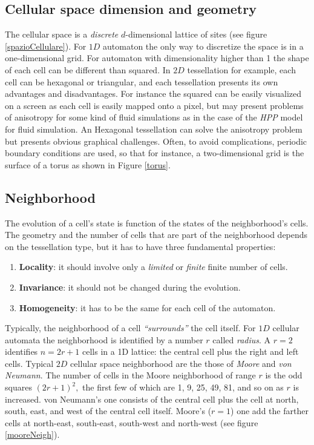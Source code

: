 \subsection{Cellular space dimension and geometry}
The cellular space is a \emph{discrete} $d$-dimensional lattice of sites (see
figure \ref{spazioCellulare}).
For $1D$ automaton the only way to discretize the space is in a one-dimensional
grid. For automaton with dimensionality higher than 1 the shape of each cell can
be different than squared. In $2D$ tessellation for example, each cell can be
hexagonal or triangular, and each tessellation presents its own advantages and disadvantages. For instance the squared can be easily visualized on a screen as each cell is easily mapped onto a pixel, but may present problems of anisotropy for some kind of fluid simulations as in the case of the \textit{HPP} model for fluid simulation\cite{Frisch1986}. An Hexagonal tessellation can solve the anisotropy problem\cite{wolfram1986} but presents obvious graphical challenges. Often, to avoid complications, periodic boundary conditions are used, so that for instance, a two-dimensional grid is the surface of a torus as shown in Figure \ref{torus}.

\subsection{Neighborhood}
The evolution of a cell's state is function of the states of the neighborhood's
cells. The geometry and the number of cells that are part of the neighborhood
depends on the tessellation type, but it has to have three fundamental
properties:
\begin{enumerate}
  \item \textbf{Locality}: it should involve only a \textit{limited} or \textit{finite} finite number of cells.
  \item \textbf{Invariance}: it should not be changed during the evolution.
  \item \textbf{Homogeneity}: it has to be the same for each cell of the
  automaton.
\end{enumerate}
Typically, the neighborhood of a cell \textit{``surrounds''} the cell itself.
For $1D$ cellular automata the neighborhood is identified by a number $r$ called \textit{radius}\cite{wolfram1983}. A $r=2$ identifies
$n=2r+1$ cells in a 1D lattice: the central cell plus the
right and left cells. Typical $2D$ cellular space neighborhood are the those of \textit{Moore} and \textit{von Neumann}. The number of cells in the Moore neighborhood of range $r$ is the odd squares $(2r+1)^2,$ the
first few of which are 1, 9, 25, 49, 81, and so on as $r$ is increased.
von Neumann's one consists of the central cell plus the cell at north, south,
east, and west of the central cell itself. Moore's ($r=1$)
one add  the farther cells at north-east, south-east, south-west and north-west
(see figure \ref{mooreNeigh}).


